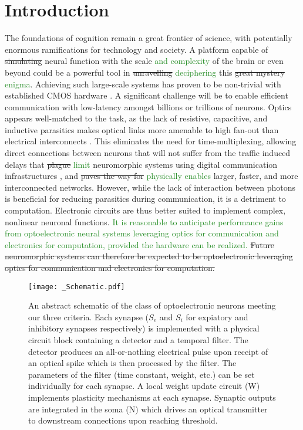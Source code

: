 \documentclass[twocolumn]{article}
\begin{document}
\setcounter{tocdepth}{4}
\setcounter{secnumdepth}{4}

\section{\label{sec:introduction}Introduction}
The foundations of cognition remain a great frontier of science, with potentially enormous ramifications for technology and society. A platform capable of \sout{simulating} neural function with the scale \textcolor{ForestGreen}{and complexity} of the brain or even beyond could be a powerful tool in \sout{unravelling} \textcolor{ForestGreen}{deciphering} this \sout{great mystery} \textcolor{ForestGreen}{enigma}. Achieving such large-scale systems has proven to be non-trivial with established CMOS hardware \cite{furber2016large}. A significant challenge will be to enable efficient communication with low-latency amongst billions or trillions of neurons. Optics appears well-matched to the task, as the lack of resistive, capacitive, and inductive parasitics makes optical links more amenable to high fan-out than electrical interconnects \cite{shainline2019superconducting}. This eliminates the need for time-multiplexing, allowing direct connections between neurons that will not suffer from the traffic induced delays that \sout{plague} \textcolor{ForestGreen}{limit} neuromorphic systems using digital communication infrastructures \cite{young2019review}, and \sout{paves the way for} \textcolor{ForestGreen}{physically enables} larger, faster, and more interconnected networks. However, while the lack of interaction between photons is beneficial for reducing parasitics during communication, it is a detriment to computation. Electronic circuits are thus better suited to implement complex, nonlinear neuronal functions. \textcolor{ForestGreen}{It is reasonable to anticipate performance gains from optoelectronic neural systems leveraging optics for communication and electronics for computation, provided the hardware can be realized.} \sout{Future neuromorphic systems can therefore be expected to be optoelectronic \textemdash leveraging optics for communication and electronics for computation.}

\begin{figure*}
    \centering
    \texttt{[image: \_Schematic.pdf]}
    \caption{An abstract schematic of the class of optoelectronic neurons meeting our three criteria. Each synapse ($S_e$ and $S_i$ for expiatory and inhibitory synapses respectively) is implemented with a physical circuit block containing a detector and a temporal filter. The detector produces an all-or-nothing electrical pulse upon receipt of an optical spike which is then processed by the filter. The parameters of the filter (time constant, weight, etc.) can be set individually for each synapse. A local weight update circuit (W) implements plasticity mechanisms at each synapse. Synaptic outputs are integrated in the soma (N) which drives an optical transmitter to downstream connections upon reaching threshold.}
    \label{fig:Schematic}
\end{figure*}
\end{document}
